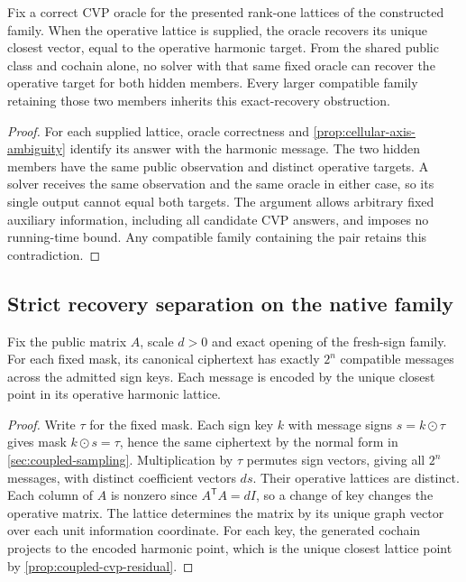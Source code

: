 \begin{corollary}
  \label{cor:lattice-member-separation}
  Fix a correct CVP oracle for the presented rank-one lattices of the
  constructed family. When the operative lattice is supplied, the oracle
  recovers its unique closest vector, equal to the operative harmonic target.
  From the shared public class and cochain alone, no solver with that same
  fixed oracle can recover the operative target for both hidden members.
  Every larger compatible family retaining those two members inherits this
  exact-recovery obstruction.
\end{corollary}

\begin{proof}
  For each supplied lattice, oracle correctness and
  \cref{prop:cellular-axis-ambiguity} identify its answer with the harmonic
  message. The two hidden members have the same public observation and
  distinct operative targets. A solver receives the same observation and
  the same oracle in either case, so its single output cannot equal both
  targets. The argument allows arbitrary fixed auxiliary information,
  including all candidate CVP answers, and imposes no running-time bound.
  Any compatible family containing the pair retains this contradiction.
\end{proof}

\subsection{Strict recovery separation on the native family}

\begin{proposition}
\label{prop:coupled-cvp-candidate-count}
Fix the public matrix \(A\), scale \(d>0\) and exact opening of the fresh-sign
family. For each fixed mask, its canonical ciphertext has exactly \(2^n\)
compatible messages across the admitted sign keys. Each message is encoded
by the unique closest point in its operative harmonic lattice.
\end{proposition}

\begin{proof}
Write \(\tau\) for the fixed mask. Each sign key \(k\) with message signs
\(s=k\mathbin\odot\tau\) gives mask \(k\mathbin\odot s=\tau\), hence the
same ciphertext by the normal form in \cref{sec:coupled-sampling}.
Multiplication by \(\tau\) permutes sign vectors, giving all \(2^n\) messages,
with distinct coefficient vectors \(ds\). Their operative lattices are
distinct. Each column of \(A\) is nonzero since \(A^{\mathsf T}A=dI\), so a
change of key changes the operative matrix. The lattice determines the
matrix by its unique graph vector over each unit information coordinate.
For each key, the generated cochain projects to the encoded harmonic point,
which is the unique closest lattice point by \cref{prop:coupled-cvp-residual}.
\end{proof}

